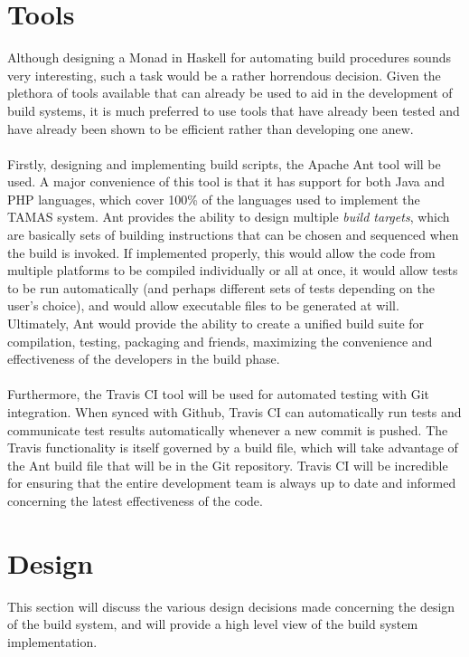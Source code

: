 \documentclass[12pt]{report}
\begin{document}
\section{Tools}
\label{s:build-tools}
Although designing a Monad in Haskell for automating build procedures sounds very interesting, such
a task would be a rather horrendous decision. Given the plethora of tools available that can already
be used to aid in the development of build systems, it is much preferred to use tools that have
already been tested and have already been shown to be efficient rather than developing one anew.\\\\
Firstly, designing and implementing build scripts, the Apache Ant tool will be used. A major
convenience of this tool is that it has support for both Java and PHP languages, which cover 100\%
of the languages used to implement the TAMAS system. Ant provides the ability to design multiple
\textit{build targets}, which are basically sets of building instructions that can be chosen and
sequenced when the build is invoked. If implemented properly, this would allow the code from
multiple platforms to be compiled individually or all at once, it would allow tests to be run
automatically (and perhaps different sets of tests depending on the user's choice), and would allow
executable files to be generated at will. Ultimately, Ant would provide the ability to create a
unified build suite for compilation, testing, packaging and friends, maximizing the convenience and
effectiveness of the developers in the build phase.\\\\
Furthermore, the Travis CI tool will be used for automated testing with Git integration. When synced
with Github, Travis CI can automatically run tests and communicate test results automatically
whenever a new commit is pushed. The Travis functionality is itself governed by a build file, which
will take advantage of the Ant build file that will be in the Git repository. Travis CI will be
incredible for ensuring that the entire development team is always up to date and informed
concerning the latest effectiveness of the code.
\section{Design}
This section will discuss the various design decisions made concerning the design of the build
system, and will provide a high level view of the build system implementation.
\end{document}
